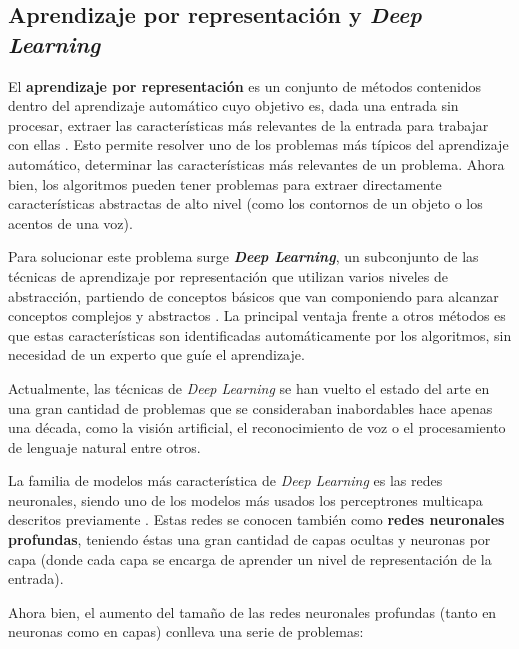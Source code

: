 \subsection{Aprendizaje por representación y \textit{Deep Learning}}

El \textbf{aprendizaje por representación} es un conjunto de métodos contenidos dentro del aprendizaje automático cuyo objetivo es, dada una entrada sin procesar, extraer las características más relevantes de la entrada para trabajar con ellas \cite{Goodfellow-et-al-2016}. Esto permite resolver uno de los problemas más típicos del aprendizaje automático, determinar las características más relevantes de un problema. Ahora bien, los algoritmos pueden tener problemas para extraer directamente características abstractas de alto nivel (como los contornos de un objeto o los acentos de una voz). 

Para solucionar este problema surge \textbf{\textit{Deep Learning}}, un subconjunto de las técnicas de aprendizaje por representación que utilizan varios niveles de abstracción, partiendo de conceptos básicos que van componiendo para alcanzar conceptos complejos y abstractos \cite{Goodfellow-et-al-2016}. La principal ventaja frente a otros métodos es que estas características son identificadas automáticamente por los algoritmos, sin necesidad de un experto que guíe el aprendizaje.

Actualmente, las técnicas de \textit{Deep Learning} se han vuelto el estado del arte en una gran cantidad de problemas que se consideraban inabordables hace apenas una década, como la visión artificial, el reconocimiento de voz o el procesamiento de lenguaje natural \cite{Goodfellow-et-al-2016} entre otros.

La familia de modelos más característica de \textit{Deep Learning} es las redes neuronales, siendo uno de los modelos más usados los perceptrones multicapa descritos previamente \cite{Goodfellow-et-al-2016}. Estas redes se conocen también como \textbf{redes neuronales profundas}, teniendo éstas una gran cantidad de capas ocultas y neuronas por capa (donde cada capa se encarga de aprender un nivel de representación de la entrada).

Ahora bien, el aumento del tamaño de las redes neuronales profundas (tanto en neuronas como en capas) conlleva una serie de problemas:

